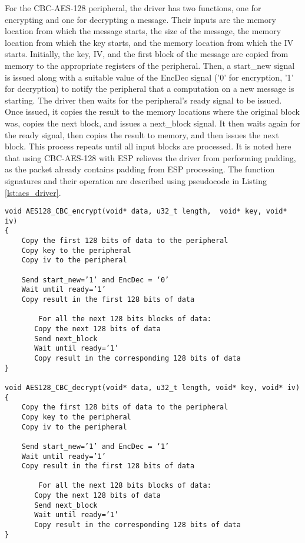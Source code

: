 For the CBC-AES-128 peripheral, the driver has two functions, one for encrypting and one for decrypting a message. Their inputs are the memory location from which the message starts, the size of the message, the memory location from which the key starts, and the memory location from which the IV starts. Initially, the key, IV, and the first block of the message are copied from memory to the appropriate registers of the peripheral. Then, a start\_new signal is issued along with a suitable value of the EncDec signal ('0' for encryption, '1' for decryption) to notify the peripheral that a computation on a new message is starting. The driver then waits for the peripheral's ready signal to be issued. Once issued, it copies the result to the memory locations where the original block was, copies the next block, and issues a next\_block signal. It then waits again for the ready signal, then copies the result to memory, and then issues the next block. This process repeats until all input blocks are processed. It is noted here that using CBC-AES-128 with ESP relieves the driver from performing padding, as the packet already contains padding from ESP processing. The function signatures and their operation are described using pseudocode in Listing \ref{lst:aes_driver}. \\


\begin{lstlisting}[style=mycodestyle, label={lst:aes_driver}, caption={AES driver pseudocode}]
void AES128_CBC_encrypt(void* data, u32_t length,  void* key, void* iv)
{
	Copy the first 128 bits of data to the peripheral
	Copy key to the peripheral
	Copy iv to the peripheral

	Send start_new=’1’ and EncDec = ‘0’
	Wait until ready=’1’
	Copy result in the first 128 bits of data

        For all the next 128 bits blocks of data:
	   Copy the next 128 bits of data
	   Send next_block
	   Wait until ready=’1’
	   Copy result in the corresponding 128 bits of data
}

void AES128_CBC_decrypt(void* data, u32_t length, void* key, void* iv)
{
	Copy the first 128 bits of data to the peripheral
	Copy key to the peripheral
	Copy iv to the peripheral

	Send start_new=’1’ and EncDec = ‘1’
	Wait until ready=’1’
	Copy result in the first 128 bits of data

        For all the next 128 bits blocks of data:
	   Copy the next 128 bits of data
	   Send next_block
	   Wait until ready=’1’
	   Copy result in the corresponding 128 bits of data
}
\end{lstlisting}\\


